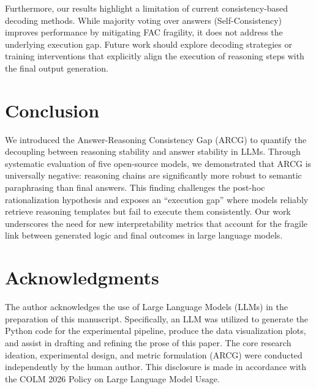 \documentclass{article} %
\begin{document}
Furthermore, our results highlight a limitation of current consistency-based decoding methods. While majority voting over answers (Self-Consistency) improves performance by mitigating FAC fragility, it does not address the underlying execution gap. Future work should explore decoding strategies or training interventions that explicitly align the execution of reasoning steps with the final output generation.

\section{Conclusion}

We introduced the Answer-Reasoning Consistency Gap (ARCG) to quantify the decoupling between reasoning stability and answer stability in LLMs. Through systematic evaluation of five open-source models, we demonstrated that ARCG is universally negative: reasoning chains are significantly more robust to semantic paraphrasing than final answers. This finding challenges the post-hoc rationalization hypothesis and exposes an ``execution gap'' where models reliably retrieve reasoning templates but fail to execute them consistently. Our work underscores the need for new interpretability metrics that account for the fragile link between generated logic and final outcomes in large language models.

\section*{Acknowledgments}
The author acknowledges the use of Large Language Models (LLMs) in the preparation of this manuscript. Specifically, an LLM was utilized to generate the Python code for the experimental pipeline, produce the data visualization plots, and assist in drafting and refining the prose of this paper. The core research ideation, experimental design, and metric formulation (ARCG) were conducted independently by the human author. This disclosure is made in accordance with the COLM 2026 Policy on Large Language Model Usage.



\end{document}
